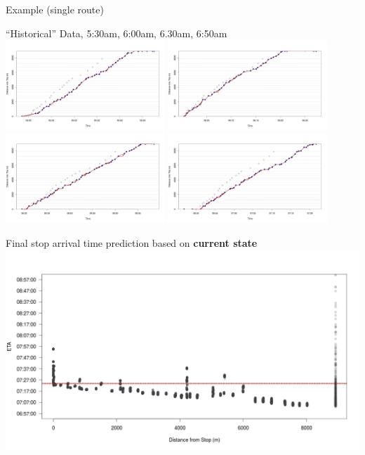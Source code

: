 \documentclass[10pt,t]{beamer}
\begin{document}
\begin{frame}{Example (single route)}
\begin{overprint}
    \vspace{2em}
    ``Historical'' Data, 5:30am, 6:00am, 6.30am, 6:50am
    \centering
    \includegraphics[width=0.45\textwidth]{figs/r274/TRIP1_distance_traveled.png}
    \includegraphics[width=0.45\textwidth]{figs/r274/TRIP2_distance_traveled.png}\\
    \includegraphics[width=0.45\textwidth]{figs/r274/TRIP3_distance_traveled.png}
    \includegraphics[width=0.45\textwidth]{figs/r274/TRIP4_distance_traveled.png}


    \vspace{2em}
    Final stop arrival time prediction based on \textbf{current state}
    \centering
    \includegraphics[width=1\textwidth]{figs/r274/TRIP5_arrival_last_state.png}


\end{overprint}
\end{frame}
\end{document}
